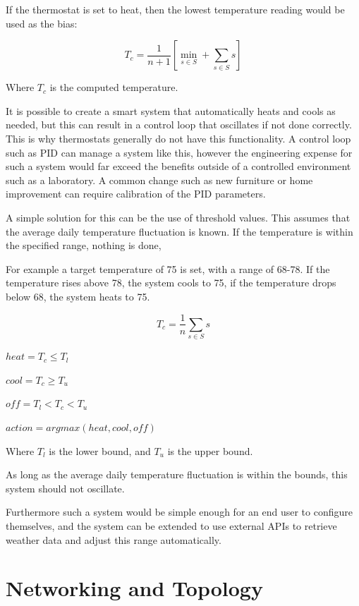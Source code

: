 \documentclass[10pt, journal]{IEEEtran} %
\begin{document}
If the thermostat is set to heat,
then the lowest temperature reading would be used as the bias:

\[
T_c = \frac{1}{n+1}\left[ \min_{s \in S} + \sum_{s \in S}{s} \right]
\]

Where $T_c$ is the computed temperature.

\bigskip


It is possible to create a smart system that automatically heats and cools as needed,
but this can result in a control loop that oscillates if not done correctly.
This is why thermostats generally do not have this functionality.
A control loop such as PID can manage a system like this,
however the engineering expense for such a system would far exceed the benefits 
outside of a controlled environment such as a laboratory.
A common change such as new furniture or home improvement
can require calibration of the PID parameters.

A simple solution for this can be the use of threshold values.
This assumes that the average daily temperature fluctuation is known.
If the temperature is within the specified range, nothing is done,

For example a target temperature of 75 is set, with a range of 68-78.
If the temperature rises above 78, the system cools to 75,
if the temperature drops below 68, the system heats to 75.

\[
T_c = \frac{1}{n}\sum_{s \in S}{s}
\]

$heat = T_c \le T_l$

$cool = T_c \ge T_u$

$off = T_l < T_c < T_u$

$action = argmax(heat, cool, off)$

\smallskip

Where $T_l$ is the lower bound, and $T_u$ is the upper bound.

\bigskip

As long as the average daily temperature fluctuation is within the bounds,
this system should not oscillate.

Furthermore such a system would be simple enough for an end user to configure themselves,
and the system can be extended to use external APIs to retrieve weather data 
and adjust this range automatically.

\section{Networking and Topology}
\end{document}
